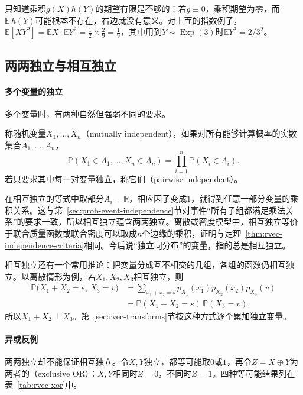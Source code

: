 只知道乘积$g(X)h(Y)$的期望有限是不够的：若$g\equiv0$，乘积期望为零，而$\mathbb E\,h(Y)$可能根本不存在，右边就没有意义。对上面的指数例子，$\mathbb E[XY^2]=\mathbb EX\cdot\mathbb EY^2=\frac12\times\frac2{9}=\frac19$，其中用到$Y\sim\operatorname{Exp}(3)$时$\mathbb EY^2=2/3^2$。

\subsection{两两独立与相互独立}

\paragraph{多个变量的独立}
多个变量时，有两种自然但强弱不同的要求。

\begin{definition}[相互独立与两两独立]
称随机变量$X_1,\ldots,X_n$（mutually independent），如果对所有能够计算概率的实数集合$A_1,\ldots,A_n$，
\[
 \mathbb P(X_1\in A_1,\ldots,X_n\in A_n)=\prod_{i=1}^n\mathbb P(X_i\in A_i).
\]
若只要求其中每一对变量独立，称它们（pairwise independent）。
\end{definition}

在相互独立的等式中取部分$A_i=\mathbb R$，相应因子变成$1$，就得到任意一部分变量的乘积关系。这与第~\ref{sec:prob-event-independence}节对事件“所有子组都满足乘法关系”的要求一致，所以相互独立蕴含两两独立。离散或密度模型中，相互独立等价于联合质量函数或联合密度可以取成$n$个边缘的乘积，证明与定理~\ref{thm:rvec-independence-criteria}相同。今后说“独立同分布”的变量，指的总是相互独立。

相互独立还有一个常用推论：把变量分成互不相交的几组，各组的函数仍相互独立。以离散情形为例，若$X_1,X_2,X_3$相互独立，则
\[
\begin{aligned}
 \mathbb P\bigl(X_1+X_2=s,\,X_3=v\bigr)&=\sum_{x_1+x_2=s}p_{X_1}(x_1)p_{X_2}(x_2)p_{X_3}(v)\\
 &=\mathbb P(X_1+X_2=s)\,\mathbb P(X_3=v),
\end{aligned}
\]
所以$X_1+X_2\perp X_3$。第~\ref{sec:rvec-transforms}节按这种方式逐个累加独立变量。

\paragraph{异或反例}
两两独立却不能保证相互独立。令$X,Y$独立，都等可能取$0$或$1$，再令$Z=X\oplus Y$为两者的（exclusive OR）：$X,Y$相同时$Z=0$，不同时$Z=1$。四种等可能结果列在表~\ref{tab:rvec-xor}中。

